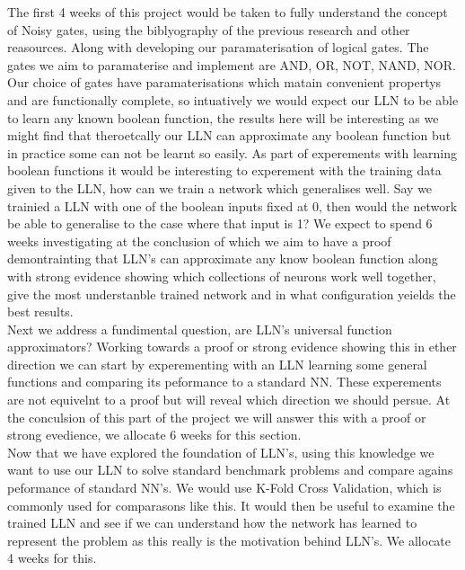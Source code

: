 \documentclass[11pt, a4paper, twoside, openright]{report}
\begin{document}
The first 4 weeks of this project would be taken to fully understand the concept of Noisy gates, using the biblyography of the previous research and other reasources. Along with developing our paramaterisation of logical gates. The gates we aim to paramaterise and implement are AND, OR, NOT, NAND, NOR. \\

Our choice of gates have paramaterisations which matain convenient propertys and are functionally complete, so intuatively we would expect our LLN to be able to learn any known boolean function, the results here will be interesting as we might find that theroetcally our LLN can approximate any boolean function but in practice some can not be learnt so easily. As part of experements with learning boolean functions it would be interesting to experement with the training data given to the LLN, how can we train a network which generalises well. Say we trainied a LLN with one of the boolean inputs fixed at 0, then would the network be able to generalise to the case where that input is 1? We expect to spend 6 weeks investigating at the conclusion of which we aim to have a proof demontrainting that LLN's can approximate any know boolean function along with strong evidence showing which collections of neurons work well together, give the most understanble trained network and in what configuration yeields the best results. \\

Next we address a fundimental question, are LLN's universal function approximators? Working towards a proof or strong evidence showing this in ether direction we can start by experementing with an LLN learning some general functions and comparing its peformance to a standard NN. These experements are not equivelnt to a proof but will reveal which direction we should persue. At the conculsion of this part of the project we will answer this with a proof or strong evedience, we allocate 6 weeks for this section. \\

Now that we have explored the foundation of LLN's, using this knowledge we want to use our LLN to solve standard benchmark problems and compare agains peformance of standard NN's. We would use K-Fold Cross Validation, which is commonly used for comparasons like this. It would then be useful to examine the trained LLN and see if we can understand how the network has learned to represent the problem as this really is the motivation behind LLN's. We allocate 4 weeks for this. \\
\end{document}
